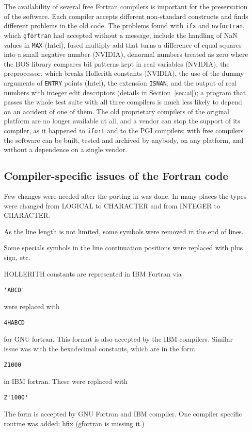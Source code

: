 The availability of several free Fortran compilers is important for the preservation of the software. Each compiler
accepts different non-standard constructs and finds different problems in the old code. The problems found with
\texttt{ifx} and \texttt{nvfortran}, which \texttt{gfortran} had accepted without a message, include the handling of
NaN values in \texttt{MAX} (Intel), fused multiply-add that turns a difference of equal squares into a small negative
number (NVIDIA), denormal numbers treated as zero where the BOS library compares bit patterns kept in real variables
(NVIDIA), the preprocessor, which breaks Hollerith constants (NVIDIA), the use of the dummy arguments of \texttt{ENTRY}
points (Intel), the extension \texttt{ISNAN}, and the output of real numbers with integer edit descriptors (details in
Section~\ref{sec:ai}); a program that passes the whole test suite with all three compilers is much less likely to depend
on an accident of one of them. The old proprietary compilers of the original platform are no longer available at all, and a
vendor can stop the support of its compiler, as it happened to \texttt{ifort} and to the PGI compilers; with free compilers
the software can be built, tested and archived by anybody, on any platform, and without a dependence on a single vendor.

\subsection{Compiler-specific issues of the Fortran code}
Few changes were needed after the porting in   was done.
In many places the types were changed from LOGICAL to CHARACTER
and from INTEGER to CHARACTER.

As the line length is not limited, some symbols were removed in the end of lines.

Some specials symbols in the line continuation positions  were replaced with plus sign, etc.

HOLLERITH constants are represented in IBM Fortran via
\begin{lstlisting}
'ABCD'
\end{lstlisting}
were replaced with
\begin{lstlisting}
4HABCD
\end{lstlisting}
for GNU fortran. This format is also accepted by the IBM compilers.
Similar issue was with the hexadecimal constants, which are in the form 
\begin{lstlisting}
Z1000
\end{lstlisting}
in IBM fortran. These were replaced with 
\begin{lstlisting}
Z'1000'
\end{lstlisting}
The form is accepted by GNU Fortran and IBM compiler.
One compiler specific routine was added: hfix (gfortran is missing it.)


